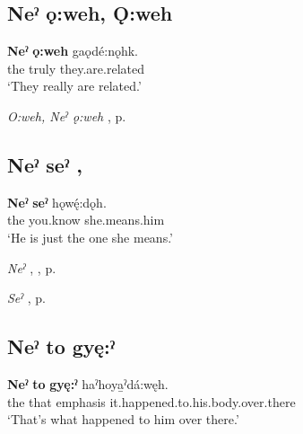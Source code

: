 \subsection*{\textbf{Neˀ ǫ:weh, Ǫ:weh} } \label{p:[neˀ ǫ:weh]}

\ea
\label{ex:npar21}
\gll \textbf{Neˀ} \textbf{ǫ:weh} gaǫdé:nǫhk.\\
the truly they.are.related\\
\glt ‘They really are related.’
\z

\begin{CayugaRelated}
\item \textit{O:weh, Neˀ ǫ:weh} , p. \pageref{p:[ǫ:weh, neˀ ǫ:weh]}
\end{CayugaRelated}

\subsection*{\textbf{Neˀ seˀ} , } \label{p:[neˀ seˀ]}

\ea
\label{ex:npar32}
\gll \textbf{Neˀ} \textbf{seˀ} hǫwę́:dǫh.\\
the you.know she.means.him\\
\glt ‘He is just the one she means.’
\z

\begin{CayugaRelated}
\item \textit{Neˀ} , , p. \pageref{p:[neˀ]}\\
\item \textit{Seˀ} , p. \pageref{p:[seˀ]}
\end{CayugaRelated}


\subsection*{\textbf{Neˀ to gyę:ˀ} } \label{p:[neˀ to gyę:ˀ]}

\ea
\label{ex:npar33}
\gll \textbf{Neˀ} \textbf{to} \textbf{gyę:ˀ} haˀhoya̱ˀdá:węh.\\
the that emphasis it.happened.to.his.body.over.there\\
\glt ‘That’s what happened to him over there.’
\z

